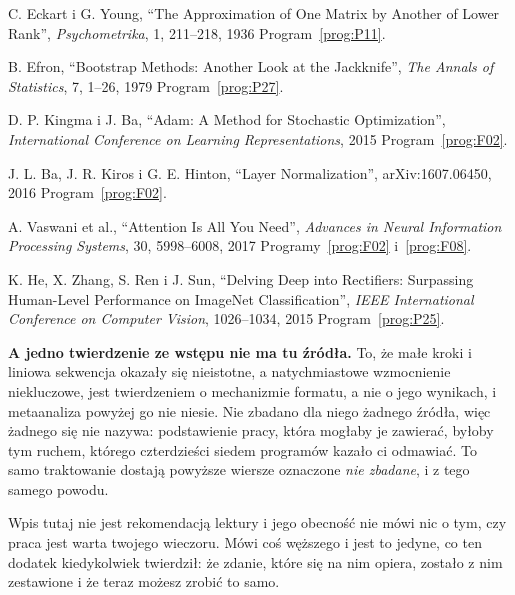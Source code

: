 \begin{reslist}
\item C. Eckart i G. Young, \enquote{The Approximation of One Matrix by
  Another of Lower Rank}, \emph{Psychometrika}, 1, 211--218, 1936 \dash{}
  Program~\ref{prog:P11}.
\item B. Efron, \enquote{Bootstrap Methods: Another Look at the Jackknife},
  \emph{The Annals of Statistics}, 7, 1--26, 1979 \dash{}
  Program~\ref{prog:P27}.
\item D. P. Kingma i J. Ba, \enquote{Adam: A Method for Stochastic
  Optimization}, \emph{International Conference on Learning Representations},
  2015 \dash{} Program~\ref{prog:F02}.
\item J. L. Ba, J. R. Kiros i G. E. Hinton, \enquote{Layer Normalization},
  arXiv:1607.06450, 2016 \dash{} Program~\ref{prog:F02}.
\item A. Vaswani et al., \enquote{Attention Is All You Need}, \emph{Advances
  in Neural Information Processing Systems}, 30, 5998--6008, 2017 \dash{}
  Programy~\ref{prog:F02} i~\ref{prog:F08}.
\item K. He, X. Zhang, S. Ren i J. Sun, \enquote{Delving Deep into
  Rectifiers: Surpassing Human-Level Performance on ImageNet Classification},
  \emph{IEEE International Conference on Computer Vision}, 1026--1034, 2015
  \dash{} Program~\ref{prog:P25}.
\end{reslist}

\medskip
\textbf{A jedno twierdzenie ze wstępu nie ma tu źródła.} To, że małe kroki i
liniowa sekwencja okazały się nieistotne, a natychmiastowe wzmocnienie
niekluczowe, jest twierdzeniem o mechanizmie formatu, a nie o jego wynikach, i
metaanaliza powyżej go nie niesie. Nie zbadano dla niego żadnego źródła, więc
żadnego się nie nazywa: podstawienie pracy, która mogłaby je zawierać, byłoby
tym ruchem, którego czterdzieści siedem programów kazało ci odmawiać. To samo
traktowanie dostają powyższe wiersze oznaczone \emph{nie zbadane}, i z tego
samego powodu.

\medskip
Wpis tutaj nie jest rekomendacją lektury i jego obecność nie mówi nic o tym,
czy praca jest warta twojego wieczoru. Mówi coś węższego i jest to jedyne, co
ten dodatek kiedykolwiek twierdził: że zdanie, które się na nim opiera,
zostało z nim zestawione i że teraz możesz zrobić to samo.
